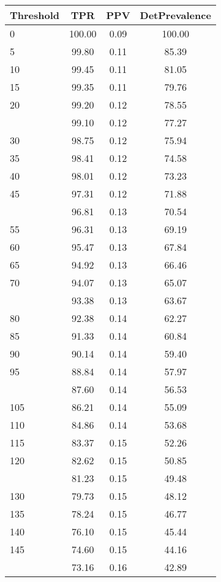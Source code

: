 \begin{table}[ht]
\centering
\begin{tabular}{lccc}
  \toprule
Threshold & TPR & PPV & DetPrevalence \\ 
  \midrule
0 & 100.00 & 0.09 & 100.00 \\ 
  5 & 99.80 & 0.11 & 85.39 \\ 
  10 & 99.45 & 0.11 & 81.05 \\ 
  15 & 99.35 & 0.11 & 79.76 \\ 
  20 & 99.20 & 0.12 & 78.55 \\ 
   \addlinespace
25 & 99.10 & 0.12 & 77.27 \\ 
  30 & 98.75 & 0.12 & 75.94 \\ 
  35 & 98.41 & 0.12 & 74.58 \\ 
  40 & 98.01 & 0.12 & 73.23 \\ 
  45 & 97.31 & 0.12 & 71.88 \\ 
   \addlinespace
50 & 96.81 & 0.13 & 70.54 \\ 
  55 & 96.31 & 0.13 & 69.19 \\ 
  60 & 95.47 & 0.13 & 67.84 \\ 
  65 & 94.92 & 0.13 & 66.46 \\ 
  70 & 94.07 & 0.13 & 65.07 \\ 
   \addlinespace
75 & 93.38 & 0.13 & 63.67 \\ 
  80 & 92.38 & 0.14 & 62.27 \\ 
  85 & 91.33 & 0.14 & 60.84 \\ 
  90 & 90.14 & 0.14 & 59.40 \\ 
  95 & 88.84 & 0.14 & 57.97 \\ 
   \addlinespace
100 & 87.60 & 0.14 & 56.53 \\ 
  105 & 86.21 & 0.14 & 55.09 \\ 
  110 & 84.86 & 0.14 & 53.68 \\ 
  115 & 83.37 & 0.15 & 52.26 \\ 
  120 & 82.62 & 0.15 & 50.85 \\ 
   \addlinespace
125 & 81.23 & 0.15 & 49.48 \\ 
  130 & 79.73 & 0.15 & 48.12 \\ 
  135 & 78.24 & 0.15 & 46.77 \\ 
  140 & 76.10 & 0.15 & 45.44 \\ 
  145 & 74.60 & 0.15 & 44.16 \\ 
   \addlinespace
150 & 73.16 & 0.16 & 42.89 \\ 

\end{tabular}
\end{table}

